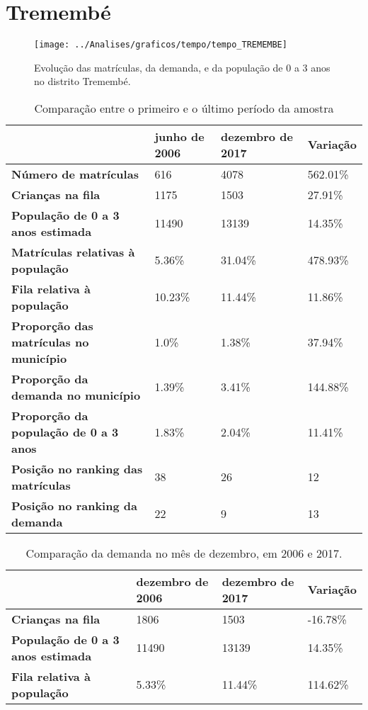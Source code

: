 \section{Tremembé}
\begin{figure}[H]
\centering
\texttt{[image: ../Analises/graficos/tempo/tempo\_TREMEMBE]}
\caption{Evolução das matrículas, da demanda, e da população de 0 a 3 anos no distrito Tremembé.}
\end{figure}
\begin{table}[H]
\begin{tabular}{|l|l|l|l|}
\hline
\textbf{}                                      & \textbf{junho de 2006}       & \textbf{dezembro de 2017}    & \textbf{Variação} \\ \hline
\textbf{Número de matrículas}                  & 616 & 4078 & 562.01\% \\ \hline
\textbf{Crianças na fila}                      & 1175 & 1503 & 27.91\% \\ \hline
\textbf{População de 0 a 3 anos estimada}      & 11490 & 13139 & 14.35\% \\ \hline
\textbf{Matrículas relativas à população}      & 5.36\% & 31.04\% & 478.93\% \\ \hline
\textbf{Fila relativa à população}             & 10.23\% & 11.44\% & 11.86\% \\ \hline
\textbf{Proporção das matrículas no município} & 1.0\% & 1.38\% & 37.94\% \\ \hline
\textbf{Proporção da demanda no município}     & 1.39\% & 3.41\% & 144.88\% \\ \hline
\textbf{Proporção da população de 0 a 3 anos}  & 1.83\% & 2.04\% & 11.41\% \\ \hline
\textbf{Posição no ranking das matrículas}     & 38 & 26 & 12 \\ \hline
\textbf{Posição no ranking da demanda}         & 22 & 9 & 13 \\ \hline
\end{tabular}
\caption{Comparação entre o primeiro e o último período da amostra}
\end{table}
\begin{table}[H]
\begin{tabular}{|l|l|l|l|}
\hline
\textbf{}                                 & \textbf{dezembro de 2006} & \textbf{dezembro de 2017} & \textbf{Variação} \\ \hline
\textbf{Crianças na fila}                      & 1806 & 1503 & -16.78\% \\ \hline
\textbf{População de 0 a 3 anos estimada}      & 11490 & 13139 & 14.35\% \\ \hline
\textbf{Fila relativa à população}             & 5.33\% & 11.44\% & 114.62\% \\ \hline
\end{tabular}
\caption{Comparação da demanda no mês de dezembro, em 2006 e 2017.}
\end{table}
